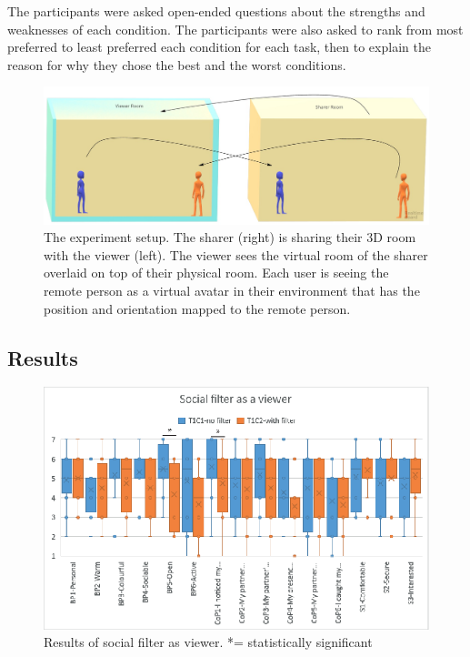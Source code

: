 The participants were asked open-ended questions about the strengths and weaknesses of each condition. The participants were also asked to rank from most preferred to least preferred each condition for each task, then to explain the reason for why they chose the best and the worst conditions. 

\begin{figure}
\begin{center}
\includegraphics[width=\linewidth]{images/frontier18/experiment-setup.jpg}
\caption{The experiment setup. The sharer (right) is sharing their 3D room with the viewer (left). The viewer sees the virtual room of the sharer overlaid on top of their physical room. Each user is seeing the remote person as a virtual avatar in their environment that has the position and orientation mapped to the remote person.}\label{fig:frontier18:setup}
\end{center}
\end{figure}

\subsection{Results}

\begin{figure}
\begin{center}
\includegraphics[width=0.8\linewidth]{images/frontier18/images-03.eps}
\caption{Results of social filter as viewer. *= statistically significant}\label{fig:frontier18:result-filter-viewer}
\end{center}
\end{figure}

